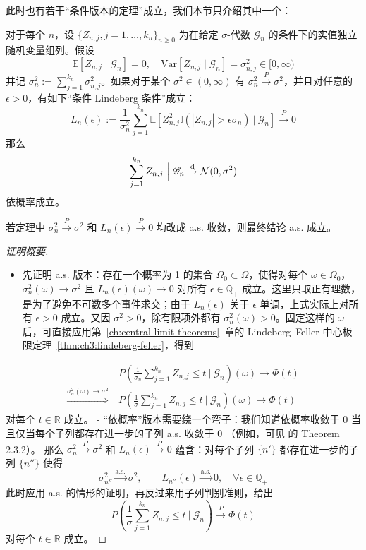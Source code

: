 此时也有若干``条件版本的定理''成立，我们本节只介绍其中一个：

\begin{theorem*}

对于每个 $n$，设 $\{Z_{n,j},j=1,\dots,k_n\}_{n\ge 0}$ 为在给定 $\sigma$-代数 $\mathscr{G}_n$ 的条件下的实值独立随机变量组列。假设
\[\mathbb{E}[Z_{n,j} \mid \mathscr{G}_n] = 0, \quad \mathrm{Var}[Z_{n,j} \mid \mathscr{G}_n] = \sigma_{n,j}^2 \in [0, \infty)\]
并记 $\sigma_n^2 := \sum_{j=1}^{k_n} \sigma_{n,j}^2$。如果对于某个 $\sigma^2 \in (0, \infty)$ 有 $\sigma_n^2 \overset{ P}\to \sigma^2$，并且对任意的 $\epsilon > 0$，有如下``条件 Lindeberg 条件''成立：
\[L_n(\epsilon) := \frac{1}{\sigma_n^2} \sum_{j=1}^{k_n} \mathbb{E}\left[ Z_{n,j}^2 \mathbb I(|Z_{n,j}| > \epsilon \sigma_n)\  \Big|\  \mathscr{G}_n \right] \overset P\to 0\]
那么
\[\sum_{j=1}^{k_n} Z_{n,j} \ \Big|\ \mathscr{G}_n \overset{\rm d}\to \mathcal{N}(0, \sigma^2)\]
依概率成立。

若定理中 $\sigma_n^2\overset P\to \sigma^2$ 和 $L_n(\epsilon)\overset{P}\to 0$ 均改成 a.s. 收敛，则最终结论 a.s. 成立。

\end{theorem*}

\begin{proof}[证明概要]

\begin{itemize}
\tightlist
\item
  先证明 a.s. 版本：存在一个概率为 1 的集合 $\Omega_0\subset \Omega$，使得对每个 $\omega\in \Omega_0$，$\sigma_n^2(\omega)\to\sigma^2$ 且 $L_n(\epsilon)(\omega)\to0$ 对所有 $\epsilon\in\mathbb Q_+$ 成立。这里只取正有理数，是为了避免不可数多个事件求交；由于 $L_n(\epsilon)$ 关于 $\epsilon$ 单调，上式实际上对所有 $\epsilon>0$ 成立。又因 $\sigma^2>0$，除有限项外都有 $\sigma_n^2(\omega)>0$。固定这样的 $\omega$ 后，可直接应用第~\ref{ch:central-limit-theorems}~章的 Lindeberg--Feller 中心极限定理~\ref{thm:ch3:lindeberg-feller}，得到
\end{itemize}
\[\begin{aligned} &P\left(\frac{1}{\sigma_n} \sum_{j=1}^{k_n} Z_{n,j} \le t\ \Bigg|\ \mathscr{G}_n \right)(\omega)\to \Phi(t)\\ \overset{\sigma_n^2(\omega)\to\sigma^2}\Longrightarrow\ & P\left(\frac{1}{\sigma} \sum_{j=1}^{k_n} Z_{n,j} \le t\ \Bigg|\ \mathscr{G}_n \right)(\omega)\to \Phi(t) \end{aligned}\]
对每个 $t\in\mathbb R$ 成立。 - ``依概率''版本需要绕一个弯子：我们知道依概率收敛于 0 当且仅当每个子列都存在进一步的子列 a.s. 收敛于 0 （例如，可见\cite{durrett2010} 的 Theorem 2.3.2）。 那么 $\sigma_n^2\overset P\to \sigma^2$ 和 $L_n(\epsilon)\overset{P}\to 0$ 蕴含：对每个子列 $\{n'\}$ 都存在进一步的子列 $\{n''\}$ 使得 \[ \sigma_{n''}^2\overset{\text{a.s.}}\to\sigma^2,\qquad L_{n''}(\epsilon)\overset{\text{a.s.}}\to0,\quad \forall \epsilon\in\mathbb Q_+ \]此时应用 a.s. 的情形的证明，再反过来用子列判别准则，给出 \[ P\left(\frac{1}{\sigma} \sum_{j=1}^{k_n} Z_{n,j} \le t\ \Bigg|\ \mathscr{G}_n \right)\overset P\to \Phi(t) \]对每个 $t\in\mathbb R$ 成立。

\end{proof}

